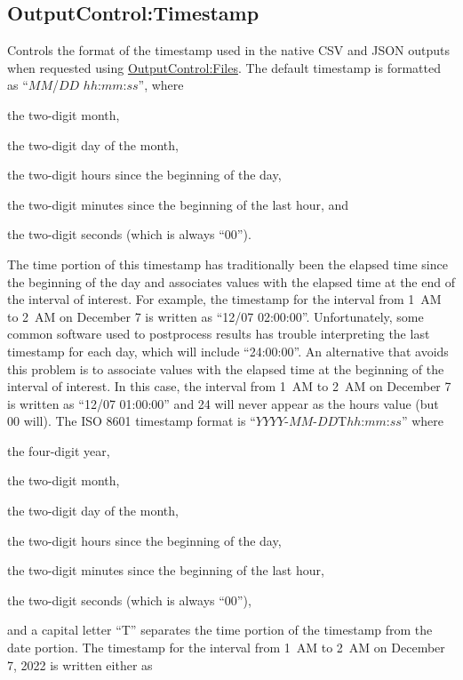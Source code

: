 \subsection{OutputControl:Timestamp}\label{outputcontrol_timestamp}

Controls the format of the timestamp used in the native CSV and JSON outputs when requested using \hyperref[outputcontrolfiles]{OutputControl:Files}. The default timestamp is formatted
as ``$MM$/$DD$ $hh$:$mm$:$ss$'', where

\begin{wherelist}
\item[MM] the two-digit month,
\item[DD] the two-digit day of the month,
\item[hh] the two-digit hours since the beginning of the day,
\item[mm] the two-digit minutes since the beginning of the last hour, and
\item[ss] the two-digit seconds (which is always ``00'').
\end{wherelist}
%
The time portion of this timestamp has traditionally been the elapsed time since the beginning of the day and associates values
with the elapsed time at the end of the interval of interest.  For example, the timestamp for the interval from 1~AM to 2~AM on
December 7 is written as ``12/07 02:00:00''. Unfortunately, some common software used to postprocess results has trouble
interpreting the last timestamp for each day, which will include ``24:00:00''. An alternative that avoids this problem is to
associate values with the elapsed time at the beginning of the interval of interest. In this case, the interval from 1~AM to
2~AM on December 7 is written as ``12/07 01:00:00'' and 24 will never appear as the hours value (but 00 will). The ISO 8601
timestamp format is ``$YYYY$-$MM$-$DD$T$hh$:$mm$:$ss$'' where

\begin{wherelist}
\item[YYYY] the four-digit year,
\item[MM] the two-digit month,
\item[DD] the two-digit day of the month,
\item[hh] the two-digit hours since the beginning of the day,
\item[mm] the two-digit minutes since the beginning of the last hour,
\item[ss] the two-digit seconds (which is always ``00''),
\end{wherelist}
%
and a capital letter ``T'' separates the time portion of the timestamp from the date portion. The timestamp for the interval from
1~AM to 2~AM on December 7, 2022 is written either as

